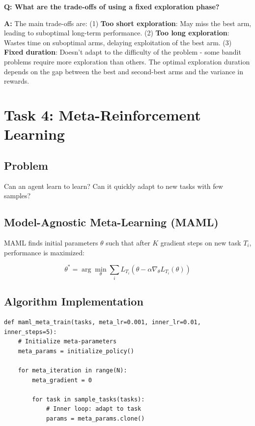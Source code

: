 \documentclass[12pt]{article}
\begin{document}
{{{\textbf{Q: What are the trade-offs of using a fixed exploration phase?}

\textbf{A:} The main trade-offs are: (1) \textbf{Too short exploration}: May miss the best arm, leading to suboptimal long-term performance. (2) \textbf{Too long exploration}: Wastes time on suboptimal arms, delaying exploitation of the best arm. (3) \textbf{Fixed duration}: Doesn't adapt to the difficulty of the problem - some bandit problems require more exploration than others. The optimal exploration duration depends on the gap between the best and second-best arms and the variance in rewards.

\section{Task 4: Meta-Reinforcement Learning}

\subsection{Problem}

Can an agent learn to learn? Can it quickly adapt to new tasks with few samples?

\subsection{Model-Agnostic Meta-Learning (MAML)}

MAML finds initial parameters $\theta$ such that after $K$ gradient steps on new task $T_i$, performance is maximized:

\begin{equation}
\theta^* = \arg\min_\theta \sum_i L_{T_i}(\theta - \alpha\nabla_\theta L_{T_i}(\theta))
\end{equation}

\subsection{Algorithm Implementation}

\begin{verbatim}
def maml_meta_train(tasks, meta_lr=0.001, inner_lr=0.01, inner_steps=5):
    # Initialize meta-parameters
    meta_params = initialize_policy()
    
    for meta_iteration in range(N):
        meta_gradient = 0
        
        for task in sample_tasks(tasks):
            # Inner loop: adapt to task
            params = meta_params.clone()
            

\end{verbatim}}}}
\end{document}
